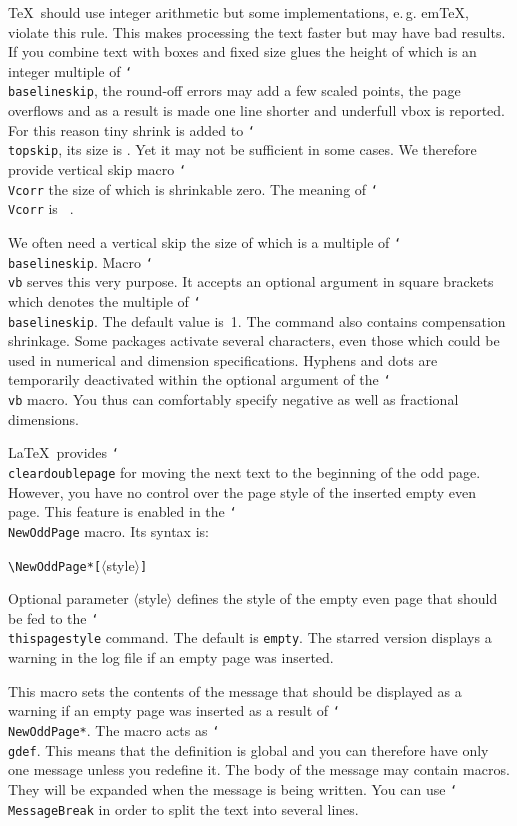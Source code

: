 \documentclass[11pt]{article}
\makeatletter
\def\mg#1{\ifvmode\leavevmode\fi\marginpar{\texttt{#1}}\ignorespaces}
\def\cmg#1{\mg{\char`\\#1}}
\DeclareRobustCommand\cmd[1]{\texttt{\char`\\#1}}
\def\eg.{e.\,g.\@}
\let\zwcomma\,
\def\,{\texorpdfstring{\zwcomma}{}}
\makeatother
\begin{document}
\cmg{topskip}
\cmg{Vcorr}
\TeX\ should use integer arithmetic but some implementations, \eg. em\TeX, violate this rule. This
makes processing the text faster but may have bad results. If you combine text with boxes and fixed
size glues the height of which is an integer multiple of \cmd{baselineskip}, the round-off errors
may add a few scaled points, the page overflows and as a result is made one line shorter and
underfull vbox is reported. For this reason tiny shrink is added to \cmd{topskip}, its
size is \the\topskip. Yet it may not be sufficient in some cases. We therefore provide vertical
skip macro \cmd{Vcorr} the size of which is shrinkable zero. The meaning of \cmd{Vcorr} is {\tt
\meaning\Vcorr}.

\cmg{vb}
We often need a vertical skip the size of which is a multiple of \cmd{baselineskip}. Macro \cmd{vb}
serves this very purpose. It accepts an optional argument in square brackets which denotes the
multiple of \cmd{baselineskip}. The default value is~1. The command also contains compensation
shrinkage. Some packages activate several characters, even those which could be used in numerical
and dimension specifications. Hyphens and dots are temporarily deactivated within the optional
argument of the \cmd{vb} macro. You thus can comfortably specify negative as well as fractional
dimensions.

\cmg{NewOddPage}
\LaTeX\ provides \cmd{cleardoublepage} for moving the next text to the beginning of the odd page.
However, you have no control over the page style of the inserted empty even page. This feature is
enabled in the \cmd{NewOddPage} macro. Its syntax is:

\vb
\verb;\NewOddPage*[;$\langle$style$\rangle$\verb;];

\vb\noindent
Optional parameter $\langle$style$\rangle$ defines the style of the empty even page that should be
fed to the \cmd{thispagestyle} command. The default is \texttt{empty}. The starred version displays
a warning in the log file if an empty page was inserted.

\cmg{SetOddPageMessage}
This macro sets the contents of the message that should be displayed as a warning if an empty page
was inserted as a result of \cmd{NewOddPage*}. The macro acts as \cmd{gdef}. This means that the
definition is global and you can therefore have only one message unless you redefine it. The body
of the message may contain macros. They will be expanded when the message is being written. You can
use \cmd{MessageBreak} in order to split the text into several lines.
\end{document}
